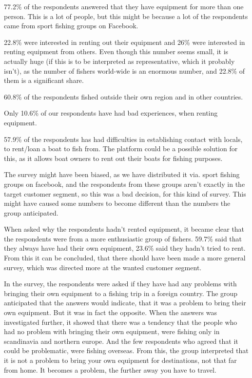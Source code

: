 77.2\% of the respondents answered that they have equipment for more than one person. This is a lot of people, but this might be because a lot of the respondents came from sport fishing groups on Facebook.


22.8\% were interested in renting out their equipment and 26\% were interested in renting equipment from others. Even though this number seems small, it is actually huge (if this is to be interpreted as representative, which it probably isn’t), as the number of fishers world-wide is an enormous number, and 22.8\% of them is a significant share.


60.8\% of the respondents fished outside their own region and in other countries.


Only 10.6\% of our respondents have had bad experiences, when renting equipment.


57.9\% of the respondents has had difficulties in establishing contact with locals, to rent/loan a boat to fish from. The platform could be a possible solution for this, as it allows boat owners to rent out their boats for fishing purposes.


The survey might have been biased, as we have distributed it via. sport fishing groups on facebook, and the respondents from these groups aren’t exactly in the target customer segment, so this was a bad decision, for this kind of survey.
This might have caused some numbers to become different than the numbers the group anticipated.


When asked why the respondents hadn’t rented equipment, it became clear that the respondents were from a more enthusiastic group of fishers. 59.7\% said that they always have had their own equipment, 23.6\% said they hadn’t tried to rent. From this it can be concluded, that there should have been made a more general survey, which was directed more at the wanted customer segment.


In the survey, the respondents were asked if they have had any problems with bringing their own equipment to a fishing trip in a foreign country. The group anticipated that the answers would indicate, that it was a problem to bring their own equipment. But it was in fact the opposite.
When the answers was investigated further, it showed that there was a tendency that the people who had no problem with bringing their own equipment, were fishing only in scandinavia and northern europe. And the few respondents who agreed that it could be problematic, were fishing overseas.
From this, the group interpreted that it is not a problem to bring your own equipment for destinations, not that far from home. It becomes a problem, the further away you have to travel.


